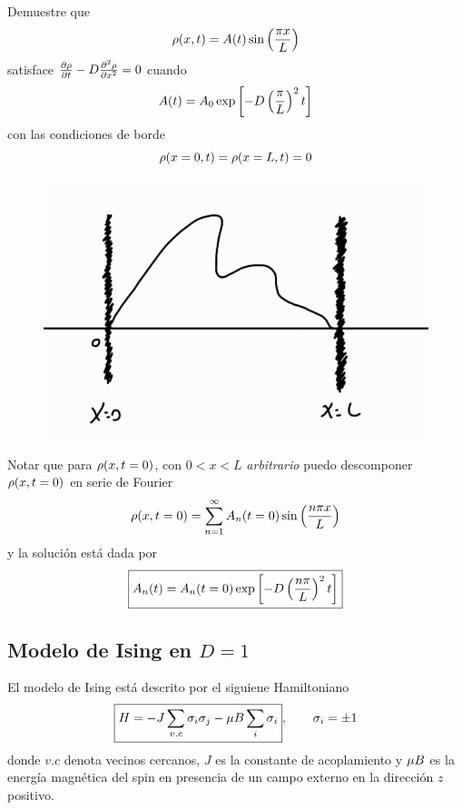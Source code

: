 \begin{ej}
	Demuestre que $$\rho(x,t)=A(t)\sin\left(\frac{\pi x}{L}\right)$$ satisface $\pdv{\rho}{t}-D\pdv[2]{\rho}{x}=0$ cuando $$A(t)=A_0\exp\left[-D\left(\frac{\pi }{L}\right)^2t\right]$$
	con las condiciones de borde
	\begin{equation}
  \rho(x=0,t)=\rho(x=L,t)=0
\end{equation}
\end{ej}
\begin{figure}[h!]
	\centering
	\includegraphics[scale=0.5]{fig/sin}
\end{figure}
Notar que para $\rho(x,t=0)$, con $0<x<L$ \textit{arbitrario} puedo descomponer $\rho(x,t=0)$ en serie de Fourier 
\begin{equation}
  \rho(x,t=0)=\sum_{n=1}^\infty A_n(t=0)\sin\left(\frac{n\pi x}{L}\right)
\end{equation}
y la solución está dada por
\begin{equation}
 \boxed{ A_n(t)=A_n(t=0)\exp\left[-D\left(\frac{n \pi }{L}\right)^2t\right]}
\end{equation}

\subsection{Modelo de Ising en $D=1$}
El modelo de Ising está descrito por el siguiene Hamiltoniano
\begin{equation}
 \boxed{ H=-J\sum_{v.c}\sigma_i\sigma_j-\mu B\sum_i\sigma_i},\qquad \sigma_i=\pm1 
\end{equation}
donde $v.c$ denota vecinos cercanos, $J$ es la constante de acoplamiento y $\mu B$ es la energía magnética del spin en presencia de un campo externo en la dirección $z$ positivo.

